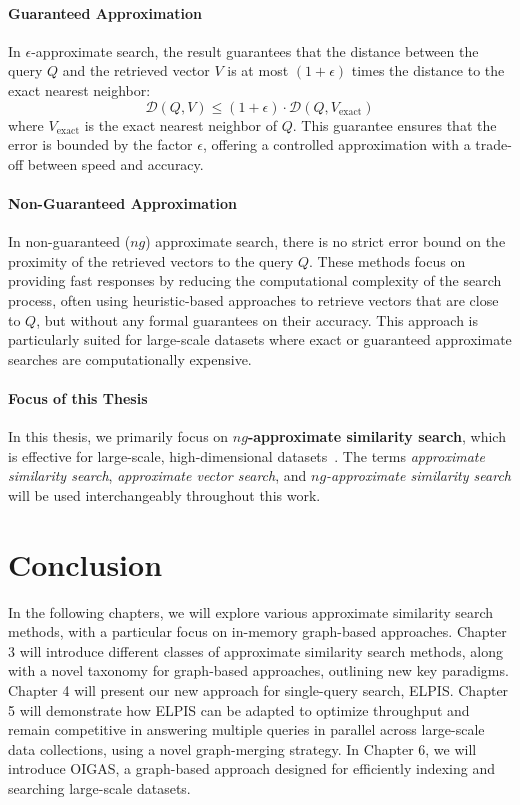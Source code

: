 \paragraph{Guaranteed Approximation}
In \(\epsilon\)-approximate search, the result guarantees that the distance between the query \(Q\) and the retrieved vector \(V\) is at most \((1 + \epsilon)\) times the distance to the exact nearest neighbor:
\begin{equation}
    \mathcal{D}(Q, V) \leq (1 + \epsilon) \cdot \mathcal{D}(Q, V_{\text{exact}})
    \label{eq:approx_knn_guarantee}
\end{equation}
where \(V_{\text{exact}}\) is the exact nearest neighbor of \(Q\). This guarantee ensures that the error is bounded by the factor \(\epsilon\), offering a controlled approximation with a trade-off between speed and accuracy.

\paragraph{Non-Guaranteed Approximation}
In non-guaranteed ($ng$) approximate search, there is no strict error bound on the proximity of the retrieved vectors to the query \(Q\). These methods focus on providing fast responses by reducing the computational complexity of the search process, often using heuristic-based approaches to retrieve vectors that are close to \(Q\), but without any formal guarantees on their accuracy. This approach is particularly suited for large-scale datasets where exact or guaranteed approximate searches are computationally expensive.

\paragraph{Focus of this Thesis}
In this thesis, we primarily focus on \textbf{$ng$-approximate similarity search}, which is effective for large-scale, high-dimensional datasets~\cite{hydra2, aumuller2017ann, conf/icde/echihabi2021,elpis,hnsw,neurips-2021-ann-competition}. The terms \textit{approximate similarity search}, \textit{approximate vector search}, and \textit{$ng$-approximate similarity search} will be used interchangeably throughout this work.


\section{Conclusion}
In the following chapters, we will explore various approximate similarity search methods, with a particular focus on in-memory graph-based approaches. Chapter 3 will introduce different classes of approximate similarity search methods, along with a novel taxonomy for graph-based approaches, outlining new key paradigms. Chapter 4 will present our new approach for single-query search, ELPIS. Chapter 5 will demonstrate how ELPIS can be adapted to optimize throughput and remain competitive in answering multiple queries in parallel across large-scale data collections, using a novel graph-merging strategy. In Chapter 6, we will introduce OIGAS, a graph-based approach designed for efficiently indexing and searching large-scale datasets.